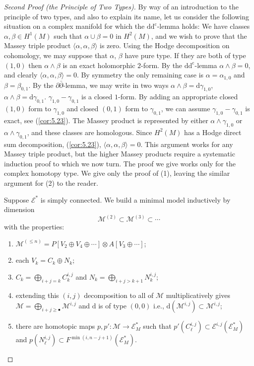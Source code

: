 \documentclass[11pt]{amsart}
\theoremstyle{plain}
\theoremstyle{definition}
\newcommand{\sE}{\mathscr{E}}
\newcommand{\cM}{\mathcal{M}}
\newcommand{\dd}{\mathrm{d}}
\newcommand{\dc}{\mathrm{d}^{\mathrm{c}}}
\begin{document}
\begin{proof}[Second Proof (the Principle of Two Types)]
By way of an introduction to the principle of two types, and also to explain its name, let us consider the following situation on a complex manifold for which the $\dd\dc$-lemma holds: We have classes $\alpha, \beta \in H^{1}(M)$ such that $\alpha \cup \beta = 0$ in $H^{2}(M)$, and we wish to prove that the Massey triple product $\langle \alpha, \alpha, \beta \rangle$ is zero. Using the Hodge decomposition on cohomology, we may suppose that $\alpha$, $\beta$ have pure type. If they are both of type $(1,0)$ then $\alpha \wedge \beta$ is an exact holomorphic $2$-form. By the $\dd\dc$-lemma $\alpha \wedge \beta = 0$, and clearly $\langle \alpha, \alpha, \beta \rangle = 0$. By symmetry the only remaining case is $\alpha = \alpha_{1,0}$ and $\beta = \beta_{0,1}$. By the $\partial\bar{\partial}$-lemma, we may write in two ways $\alpha \wedge \beta = \dd\gamma_{1,0}$, $\alpha \wedge \beta = \dd\gamma_{0,1}$. $\gamma_{1,0} - \gamma_{0,1}$ is a closed $1$-form. By adding an appropriate closed $(1,0)$ form to $\gamma_{1,0}$ and closed $(0,1)$ form to $\gamma_{0,1}$, we can assume $\gamma_{1,0} - \gamma_{0,1}$ is exact, see (\ref{cor:5.23}). The Massey product is represented by either $\alpha \wedge \gamma_{1,0}$ or $\alpha \wedge \gamma_{0,1}$, and these classes are homologous. Since $H^{2}(M)$ has a Hodge direct sum decomposition, (\ref{cor:5.23}), $\langle \alpha, \alpha, \beta \rangle = 0$. This argument works for any Massey triple product, but the higher Massey products require a systematic induction proof to which we now turn. The proof we give works only for the complex homotopy type. We give only the proof of (1), leaving the similar argument for (2) to the reader.

Suppose $\sE^{*}$ is simply connected. We build a minimal model inductively by dimension
\[
\cM^{(2)} \subset \cM^{(3)} \subset \cdots
\]
with the properties:
\begin{enumerate}
\item $\cM^{(\le n)} = P[V_{2} \oplus V_{4} \oplus \cdots] \otimes A[V_{3} \oplus \cdots]$;
\item each $V_{k} = C_{k} \oplus N_{k}$;
\item $C_{k} = \bigoplus_{i+j=k} C^{i,j}_{k}$ and $N_{k} = \bigoplus_{i+j > k+1} N^{i,j}_{k}$;
\item extending this $(i,j)$ decomposition to all of $\cM$ multiplicatively gives $\cM = \bigoplus_{i+j \ge \bullet} \cM^{i,j}$ and $\dd$ is of type $(0,0)$ i.e., $\dd(\cM^{i,j}) \subset \cM^{i,j}$;
\item there are homotopic maps $p, p' \colon \cM \to \sE^{*}_{M}$ such that $p'(C^{i,j}_{\ell}) \subset \sE^{i,j}(\sE^{*}_{M})$ and $p(N^{i,j}_{\ell}) \subset F^{\min(i, n-j+1)}(\sE^{*}_{M})$.
\end{enumerate}


\end{proof}
\end{document}

